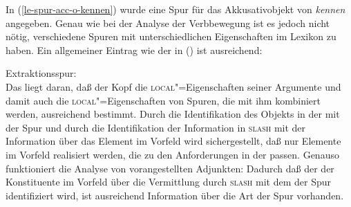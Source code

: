 \noindent
In (\ref{le-spur-acc-o-kennen}) wurde eine Spur für das Akkusativobjekt von \emph{kennen} angegeben.
Genau wie bei der Analyse der Verbbewegung ist es jedoch nicht nötig, verschiedene Spuren mit unterschiedlichen
Eigenschaften im Lexikon zu haben. Ein allgemeiner Eintrag wie der in () ist ausreichend:

\eas
\label{le-extraktionsspur}
Extraktionsspur: \\
\zs
Das liegt daran, daß der Kopf die \textsc{local}"=Eigenschaften seiner Argumente und damit auch die
\textsc{local}"=Eigenschaften von Spuren, die mit ihm kombiniert werden, ausreichend bestimmt. Durch
die Identifikation des Objekts in der \subcatl mit der Spur und durch die Identifikation der
Information in \textsc{slash} mit der Information über das Element im Vorfeld wird sichergestellt,
daß nur Elemente im Vorfeld realisiert werden, die zu den Anforderungen in der \subcatl
passen. Genauso funktioniert die Analyse von vorangestellten Adjunkten: Dadurch daß der
\localw der Konstituente im Vorfeld über die Vermittlung durch \textsc{slash} mit dem \localw der Spur
identifiziert wird, ist ausreichend Information über die Art der Spur vorhanden.


